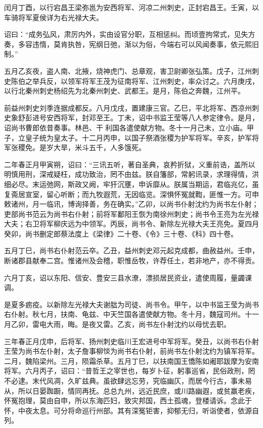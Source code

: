 \documentclass[12pt,UTF8]{ctexbook}
\begin{document}
闰月丁酉，以行宕昌王梁弥邕为安西将军、河凉二州刺史，正封宕昌王。壬寅，以车骑将军夏侯详为右光禄大夫。

诏曰：“成务弘风，肃厉内外，实由设官分职，互相惩纠。而顷壹拘常式，见失方奏，多容违惰，莫肯执咎，宪纲日弛，渐以为俗，今端右可以风闻奏事，依元熙旧制。”

五月乙亥夜，盗人南、北掖，烧神虎门、总章观，害卫尉卿张弘策。戊子，江州刺史陈伯之举兵反，以领军将军王茂为征南将军、江州刺史，率众讨之。六月庚戌，以行北秦州刺史杨绍先为北秦州刺史、武都王。是月，陈伯之奔魏，江州平。

前益州刺史刘季连据成都反。八月戊戌，置建康三官。乙巳，平北将军、西凉州刺史象舒彭进号安西将军，封邓至王。丁未，诏中书监王莹等八人参定律令。是月，诏尚书曹郎依昔奏事。林邑、干利国各遣使献方物。冬十一月己未，立小庙。甲子，立皇子统为皇太子。十二月丙申，以国子祭酒张稷为护军将军。辛亥，护军将军张稷免。是岁大旱，米斗五千，人多饿死。

二年春正月甲寅朔，诏曰：“三讯五听，著自圣典，哀矜折狱，义重前诰，盖所以明慎用刑，深戒疑枉，成功致治，罔不由兹。朕自籓部，常躬讯录，求理得情，洪细必尽。末运弛网，斯政又阙，牢犴沉壅，申诉靡从。朕属当期运，君临兆亿，虽复斋居宣室，留心听断；而九牧遐荒，无因临览。深惧怀冤就鞫，匪惟一方。可申敕诸州，月一临讯，博询择善，务在确实。”乙卯，以尚书仆射沈约为尚书左仆射；吏部尚书范云为尚书右仆射；前将军鄱阳王恢为南徐州刺史；尚书令王亮为左光禄大夫；右卫将军柳庆远为中领军。丙辰，尚书令、新除左光禄大夫王亮免。夏四月癸卯，尚书删定郎蔡法度上《梁律》二十卷、《令》三十卷、《科》四十卷。

五月丁巳，尚书右仆射范云卒。乙丑，益州刺史邓元起克成都，曲赦益州。壬申，断诸郡县献奉二宫。惟诸州及会稽，职惟岳牧，许荐任土，若非地产，亦不得贡。

六月丁亥，诏以东阳、信安、豊安三县水潦，漂损居民资业，遣使周履，量蠲课调。

是夏多疬疫。以新除左光禄大夫谢朏为司徒、尚书令。甲午，以中书监王莹为尚书右仆射。秋七月，扶南、龟兹、中天竺国各遣使献方物。冬十月，魏寇司州。十一月乙卯，雷电大雨，晦。是夜又雷。乙亥，尚书左仆射沈约以母忧去职。

三年春正月戊申，后将军、扬州刺史临川王宏进号中军将军。癸丑，以尚书右仆射王莹为尚书左仆射，太子詹事柳惔为尚书右仆射，前尚书左仆射沈约为镇军将军。二月，魏陷梁州。三月，陨霜杀草。五月丁巳，以扶南国王憍陈如阇耶跋摩为安南将军。六月丙子，诏曰：“昔哲王之宰世也，每岁卜征，躬事巡省，民俗政刑，罔不必逮。末代风凋，久旷兹典。虽欲肆远忘劳，究临幽仄，而居今行古，事未易从，所以日晏踟蹰，情同再抚。总总九州，远近民庶，或川路幽遐，或贫羸老疾，怀冤抱理，莫由自申，所以东海匹妇，致灾邦国，西土孤魂，登楼请诉。念此于怀，中夜太息。可分将命巡行州部。其有深冤钜害，抑郁无归，听诣使者，依源自列。
\end{document}
